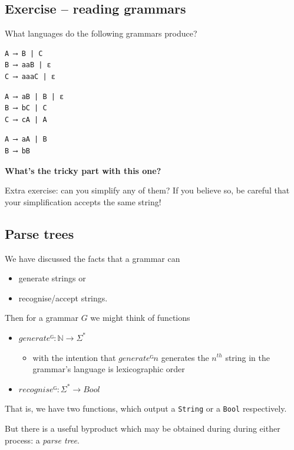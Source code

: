\documentclass[11pt]{article}
\theoremstyle{definition}
\begin{document}
\subsection{Exercise – reading grammars}
\label{sec:orge34e871}

What languages do the following grammars produce?

\begin{verbatim}
A ⟶ B | C
B ⟶ aaB | ε
C ⟶ aaaC | ε
\end{verbatim}

\begin{verbatim}
A ⟶ aB | B | ε
B ⟶ bC | C
C ⟶ cA | A
\end{verbatim}

\begin{verbatim}
A ⟶ aA | B
B ⟶ bB
\end{verbatim}
\textbf{What's the tricky part with this one?}

Extra exercise: can you simplify any of them?
If you believe so, be careful that
your simplification accepts the same string!

\subsection{Parse trees}
\label{sec:org8e6e5a7}

We have discussed the facts that a grammar can
\begin{itemize}
\item generate strings or
\item recognise/accept strings.
\end{itemize}

Then for a grammar \(G\) we might think of functions
\begin{itemize}
\item \(generateᴳ : ℕ → Σ^{*}\)
\begin{itemize}
\item with the intention that \(generateᴳ n\) generates the \(n^{th}\)
string in the grammar's language is lexicographic order
\end{itemize}
\item \(recogniseᴳ : Σ^{*} → Bool\)
\end{itemize}
That is, we have two functions, which output a \texttt{String} or
a \texttt{Bool} respectively.

But there is a useful byproduct which may be obtained during
during either process: a \emph{parse tree}.
\end{document}
